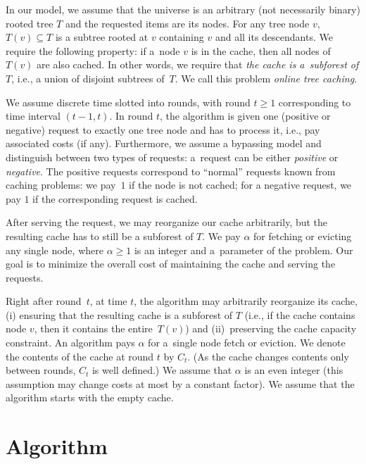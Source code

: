 In our model, we assume that the universe is
an arbitrary (not necessarily binary) rooted tree $T$ and the requested items
are its nodes. For any tree node $v$, $T(v) \subseteq T$ is a subtree rooted
at $v$ containing $v$ and all its descendants. We require the following
property: if a~node $v$ is in the cache, then all nodes of $T(v)$ are also
cached. In other words, we require that \emph{the cache is a~subforest of
$T$}, i.e., a union of disjoint subtrees of~$T$.  We call this problem
\emph{online tree caching}.

We assume discrete time slotted into rounds, with round $t \geq 1$
corresponding to time interval $(t-1,t)$. In round $t$, the algorithm is given
one (positive or negative) request to exactly one tree node and has to process
it, i.e., pay associated costs (if any). 
Furthermore, we assume a bypassing model and distinguish between two types of
requests: a~request can be either \emph{positive} or \emph{negative}. The
positive requests correspond to ``normal'' requests known from caching
problems: we pay~$1$ if the node is not cached; for a negative request, we pay
$1$ if the corresponding request is cached.

After serving the request, we may
reorganize our cache arbitrarily, but the resulting cache has to still be a
subforest of $T$. We pay $\alpha$ for fetching or evicting any single node,
where $\alpha \geq 1$ is an integer and a~parameter of the problem. Our goal
is to minimize the overall cost of maintaining the cache and serving the
requests.

Right after round~$t$, at time $t$,
the algorithm may arbitrarily reorganize its cache, (i) ensuring that the
resulting cache is a subforest of $T$ (i.e., if the cache contains node $v$,
then it contains the entire~$T(v)$) and (ii)~preserving the cache capacity
constraint. An algorithm pays $\alpha$ for a~single node fetch or eviction. We
denote the contents of the cache at round $t$ by $C_t$. (As the cache changes
contents only between rounds, $C_t$ is well defined.) We assume that $\alpha$
is an even integer (this assumption may change costs at most by a constant
factor). We assume that the algorithm starts with the empty cache.

\section{Algorithm}\label{sec:algo}

